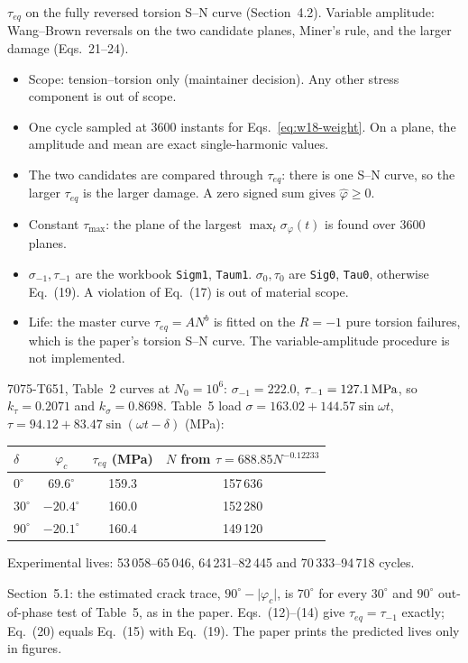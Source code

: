  $\tau_{eq}$ on the fully reversed torsion S--N curve (Section~4.2). Variable
amplitude: Wang--Brown reversals on the two candidate planes, Miner's rule, and the larger damage
(Eqs.~21--24).

\begin{itemize}
\item Scope: tension--torsion only (maintainer decision). Any other stress component is out of
  scope.
\item One cycle sampled at 3600 instants for Eqs.~\eqref{eq:w18-weight}. On a plane, the
  amplitude and mean are exact single-harmonic values.
\item The two candidates are compared through $\tau_{eq}$: there is one S--N curve, so the larger
  $\tau_{eq}$ is the larger damage. A zero signed sum gives $\hat\varphi\ge0$.
\item Constant $\tau_{\max}$: the plane of the largest $\max_t\sigma_\varphi(t)$ is found over
  3600 planes.
\item $\sigma_{-1},\tau_{-1}$ are the workbook \texttt{Sigm1}, \texttt{Taum1}. $\sigma_0,\tau_0$
  are \texttt{Sig0}, \texttt{Tau0}, otherwise Eq.~(19). A violation of Eq.~(17) is out of material
  scope.
\item Life: the master curve $\tau_{eq}=AN^b$ is fitted on the $R=-1$ pure torsion failures,
  which is the paper's torsion S--N curve. The variable-amplitude procedure is not implemented.
\end{itemize}

 7075-T651, Table~2 curves at $N_0=10^6$: $\sigma_{-1}=222.0$,
$\tau_{-1}=127.1\,\mathrm{MPa}$, so $k_\tau=0.2071$ and $k_\sigma=0.8698$. Table~5 load
$\sigma=163.02+144.57\sin\omega t$, $\tau=94.12+83.47\sin(\omega t-\delta)$ (MPa):
\begin{center}\small
\begin{tabular}{@{}lccc@{}}
\toprule
$\delta$ & $\varphi_c$ & $\tau_{eq}$ (MPa) & $N$ from $\tau=688.85N^{-0.12233}$\\\midrule
$0^\circ$ & $69.6^\circ$ & 159.3 & 157\,636\\
$30^\circ$ & $-20.4^\circ$ & 160.0 & 152\,280\\
$90^\circ$ & $-20.1^\circ$ & 160.4 & 149\,120\\
\bottomrule
\end{tabular}
\end{center}
Experimental lives: 53\,058--65\,046, 64\,231--82\,445 and 70\,333--94\,718 cycles.

 Section~5.1: the estimated crack trace, $90^\circ-\lvert\varphi_c\rvert$, is
$70^\circ$ for every $30^\circ$ and $90^\circ$ out-of-phase test of Table~5, as in the paper.
Eqs.~(12)--(14) give $\tau_{eq}=\tau_{-1}$ exactly; Eq.~(20) equals Eq.~(15) with Eq.~(19). The
paper prints the predicted lives only in figures.

